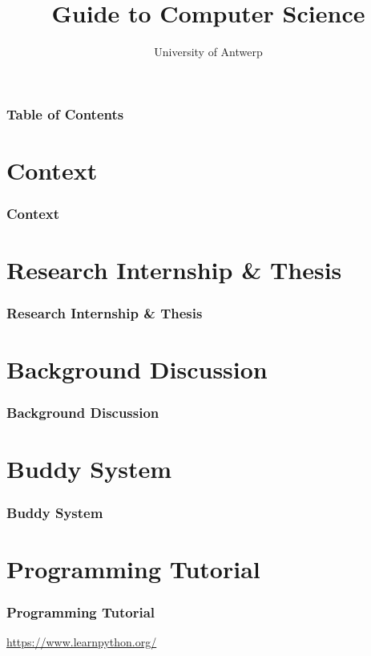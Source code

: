 \documentclass[compress]{beamer}
\title[Guide to Computer Science]{Guide to Computer Science}
\subtitle{University of Antwerp}
\author{%
	\texorpdfstring{%
		\begin{minipage}{0.45\linewidth}
			Joey~De~Pauw \\%
			\centering%
			\begin{columns}\vrule \hspace{1px}
				\begin{column}{0.5\linewidth}
					Brent~van~Bladel \\
					Tim~Leys
				\end{column} \vrule \hspace{1px}
				\begin{column}{0.5\linewidth}
					More authors.
				\end{column}
			\end{columns}
		\end{minipage}
	}
	{Joey~De~Pauw}
}
\begin{document}
	
	\maketitle
	
	
	\begin{frame}
		\frametitle{Table of Contents}
		\tableofcontents
	\end{frame}
	
	\section{Context}
	\begin{frame}
		\frametitle{Context}
		
	\end{frame}

	\section{Research Internship \& Thesis}
	\begin{frame}
		\frametitle{Research Internship \& Thesis}
		
	\end{frame}

	\section{Background Discussion}
	\begin{frame}
		\frametitle{Background Discussion}
		
	\end{frame}

	\section{Buddy System}
	\begin{frame}
		\frametitle{Buddy System}
		
	\end{frame}

	\section{Programming Tutorial}
	\begin{frame}
		\frametitle{Programming Tutorial}
		
		\url{https://www.learnpython.org/}
		
	\end{frame}
\end{document}
